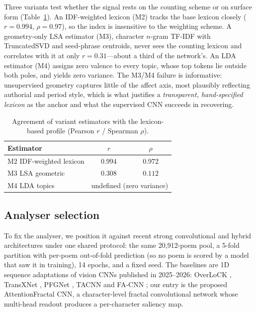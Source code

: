 \documentclass[10pt]{article}
\begin{document}
Three variants test whether the signal rests on the counting scheme or on surface form
(Table~\ref{tab:agree}). An IDF-weighted lexicon (M2) tracks the base lexicon closely
($r{=}0.994$, $\rho{=}0.97$), so the index is insensitive to the weighting scheme. A
geometry-only LSA estimator (M3), character $n$-gram TF-IDF with TruncatedSVD and
seed-phrase centroids, never sees the counting lexicon and correlates with it at only
$r{=}0.31$---about a third of the network's. An LDA estimator (M4) assigns zero
valence to every topic, whose top tokens lie outside both poles, and yields zero
variance. The M3/M4 failure is informative: unsupervised geometry captures little of
the affect axis, most plausibly reflecting authorial and period style, which is what
justifies a \emph{transparent, hand-specified lexicon} as the anchor and what the
supervised CNN succeeds in recovering.

\begin{table}[H]
\centering\footnotesize
\caption{Agreement of variant estimators with the lexicon-based profile (Pearson
$r$ / Spearman $\rho$).}
\label{tab:agree}
\begin{tabular}{lcc}
\toprule
Estimator & $r$ & $\rho$\\
\midrule
M2 IDF-weighted lexicon & $0.994$ & $0.972$\\
M3 LSA geometric & $0.308$ & $0.112$\\
M4 LDA topics & \multicolumn{2}{c}{undefined (zero variance)}\\
\bottomrule
\end{tabular}
\end{table}

\subsection{Analyser selection}
\label{sec:extbench}

To fix the analyser, we position it against recent strong convolutional and hybrid
architectures under one shared protocol: the same 20{,}912-poem pool, a 5-fold
partition with per-poem out-of-fold prediction (so no poem is scored by a model that
saw it in training), 14 epochs, and a fixed seed. The baselines are 1D sequence
adaptations of vision CNNs published in 2025--2026: OverLoCK \citep{overlock2025},
TransXNet \citep{transxnet2025}, PFGNet \citep{pfgn2026}, TACNN \citep{tacnn2026} and
FA-CNN \citep{facnn2026}; our entry is the proposed AttentionFractal CNN, a
character-level fractal convolutional network whose multi-head readout produces a
per-character saliency map.
\end{document}
